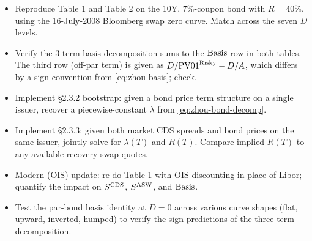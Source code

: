 \documentclass[11pt,a4paper]{article}
\begin{document}
\begin{todobox}
\begin{itemize}[noitemsep]
  \item Reproduce Table 1 and Table 2 on the 10Y, 7\%-coupon bond
        with $R = 40\%$, using the 16-July-2008 Bloomberg swap zero
        curve. Match across the seven $D$ levels.
  \item Verify the 3-term basis decomposition sums to the $\mathrm{Basis}$
        row in both tables. The third row (off-par term) is given
        as $D / \mathrm{PV01}^{\text{Risky}} - D / A$, which differs by a
        sign convention from \eqref{eq:zhou-basis}; check.
  \item Implement \S2.3.2 bootstrap: given a bond price term
        structure on a single issuer, recover a piecewise-constant
        $\lambda$ from \eqref{eq:zhou-bond-decomp}.
  \item Implement \S2.3.3: given both market CDS spreads and bond
        prices on the same issuer, jointly solve for $\lambda(T)$
        and $R(T)$. Compare implied $R(T)$ to any available recovery
        swap quotes.
  \item Modern (OIS) update: re-do Table 1 with OIS discounting in
        place of Libor; quantify the impact on $S^{\mathrm{CDS}}$, $S^{\mathrm{ASW}}$, and
        $\mathrm{Basis}$.
  \item Test the par-bond basis identity at $D = 0$ across various
        curve shapes (flat, upward, inverted, humped) to verify the
        sign predictions of the three-term decomposition.
\end{itemize}
\end{todobox}
\end{document}
